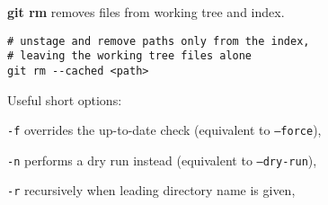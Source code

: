%

\textbf{git rm} removes files from working tree and index.

\begin{verbatim}
# unstage and remove paths only from the index,
# leaving the working tree files alone
git rm --cached <path>
\end{verbatim}

Useful short options:
\begin{compactenum}
\item [\texttt{-f}] overrides the up-to-date check (equivalent to \texttt{--force}),
\item [\texttt{-n}] performs a dry run instead (equivalent to \texttt{--dry-run}),
\item [\texttt{-r}] recursively when leading directory name is given,
\end{compactenum}

%